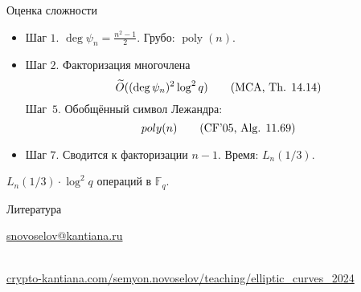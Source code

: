 \documentclass{beamer}
\begin{document}
\begin{frame}{Оценка сложности}
    \begin{itemize}
        \item Шаг $1$. $\deg \psi_n = \frac{n^2 - 1}{2}$. Грубо: $\operatorname{poly}(n)$. \\
        \item Шаг $2$.
        Факторизация многочлена
       	\begin{equation}
       	\widetilde{O}((\deg{\psi_n})^2 \log^2{q}) 	
       	\tag{\text{MCA, Th. 14.14}}
       	\end{equation}
        Шаг~$5$. Обобщённый символ Лежандра:
        \begin{equation}
        	poly(n) 
        	\tag{\text{CF'05, Alg. 11.69}}
        \end{equation}
        \item Шаг $7$. Сводится к факторизации $n-1$. Время: $L_n(1/3)$.
    \end{itemize}
    $L_n({1/3}) \cdot\log^2{q}$ операций в $\mathbb{F}_q$.
\end{frame}


\begin{frame}{Литература}
    \nocite{Washington2008}
    \nocite{Lang1978}
    \nocite{vanTuyl1997}
    \nocite{GathenJurgen2013}
    \nocite{CohenFrey+2005}
    \renewcommand*{\bibfont}{\scriptsize}
    \printbibliography
    
\begin{center}
    \begin{tcolorbox}[enhanced,hbox,colback=block-green-color-bg,colframe=subsection-color!120,title=Контакты,center title]
        \begin{varwidth}{\textwidth}
            \begin{center}
                \href{mailto:snovoselov@kantiana.ru}{snovoselov@kantiana.ru}
            \end{center}
        \end{varwidth}
    \end{tcolorbox}	
\end{center}

\\
{\footnotesize
    \href{https://crypto-kantiana.com/semyon.novoselov/teaching/elliptic_curves_2024}{crypto-kantiana.com/semyon.novoselov/teaching/elliptic\_curves\_2024}
}
\end{frame}
\end{document}
